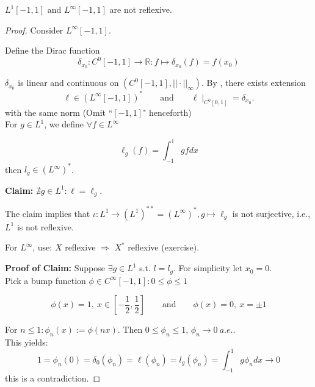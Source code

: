 \documentclass{article}
\begin{document}
\begin{proposition}
\label{non-reflexive space}
    $L^1[-1,1]$ and $L^{\infty}[-1,1]$ are not reflexive.
\end{proposition}
\begin{proof}
Consider $L^\infty[-1,1]$. 

Define the Dirac function 
$$\delta_{x_0}: C^0[-1,1] \rightarrow \mathbb{R}: f \mapsto \delta_{x_0}(f) = f(x_0)$$

$\delta_{x_0}$ is linear and continuous on $(C^0[-1,1],||\cdot ||_\infty)$. By , there exists extension 
$$\ell\in (L^\infty [-1,1])^* \qquad \text{and} \qquad \ell\mid_{C^0[0,1]} = \delta_{x_0}.$$
with the same norm (Omit \textquotedblleft $[-1,1]$" henceforth) \\

For $g\in L^1$, we define $\forall f\in L^\infty$

$$\ell_g(f) = \int_{-1}^1 gf dx$$
then $l_g\in (L^\infty)^*$.


\textbf{Claim:} $\nexists g\in L^1: \ell=\ell_g$.  

The claim implies that $\iota: L^1 \rightarrow (L^1)^{**}=(L^\infty)^*, g \mapsto \ell_g$ is not surjective, i.e., $L^1$ is not reflexive.  

For $L^\infty$, use: $X$ reflexive $\Rightarrow$ $X^*$ reflexive (exercise).  

\textbf{Proof of Claim:} Suppose $\exists g\in L^1$ s.t. $l=l_g$. For simplicity let $x_0=0$.\\
Pick a bump function $\phi \in C^\infty [-1,1]: 0 \leq \phi \leq 1$

$$
\phi(x) = 1, \ x \in [-\frac{1}{2}, \frac{1}{2}] \qquad \text{and} \qquad \phi(x)=0, \ x=\pm 1
$$

For $n\leq 1: \phi_n(x) := \phi(nx)$. Then $0\leq \phi_n \leq 1$, $\phi_n \rightarrow 0 \ a.e.$.\\
This yields: $$1 = \phi_n(0)=\delta_{0}(\phi_n) = \ell(\phi_n) = l_g(\phi_n) = \int_{-1}^1 g\phi_n dx \rightarrow 0$$
this is a contradiction.
\end{proof}
\end{document}
